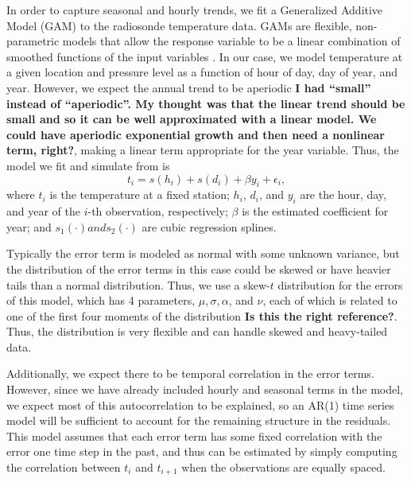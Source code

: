 \documentclass[12pt]{article}
\def\ni{\noindent}
\begin{document}
\begin{doublespacing}
In order to capture seasonal and hourly trends, we fit a Generalized Additive Model (GAM) \cite{hastie90} to the radiosonde temperature data.  GAMs are flexible, non-parametric models that allow the response variable to be a linear combination of smoothed functions of the input variables \cite{bell14}.  In our case, we model temperature at a given location and pressure level as a function of hour of day, day of year, and year.  However, we expect the annual trend to be aperiodic \textbf{I had ``small'' instead of ``aperiodic''.  My thought was that the linear trend should be small and so it can be well approximated with a linear model.  We could have aperiodic exponential growth and then need a nonlinear term, right?}, making a linear term appropriate for the year variable.  Thus, the model we fit and simulate from is
\begin{equation} \label{eq:GAM}
	t_i = s(h_i) + s(d_i) + \beta y_i + \epsilon_i,
\end{equation}
\ni where $t_i$ is the temperature at a fixed station; $h_i$, $d_i$, and $y_i$ are the hour, day, and year of the $i$-th observation, respectively; $\beta$ is the estimated coefficient for year; and $s_1(\cdot) and s_2(\cdot)$ are cubic regression splines.

Typically the error term is modeled as normal with some unknown variance, but the distribution of the error terms in this case could be skewed or have heavier tails than a normal distribution.  Thus, we use a skew-$t$ distribution for the errors of this model, which has 4 parameters, $\mu, \sigma, \alpha$, and $\nu$, each of which is related to one of the first four moments of the distribution \cite{azzalini03} \textbf{Is this the right reference?}.  Thus, the distribution is very flexible and can handle skewed and heavy-tailed data.

Additionally, we expect there to be temporal correlation in the error terms.  However, since we have already included hourly and seasonal terms in the model, we expect most of this autocorrelation to be explained, so an AR(1) time series model will be sufficient to account for the remaining structure in the residuals.  This model assumes that each error term has some fixed correlation with the error one time step in the past, and thus can be estimated by simply computing the correlation between $t_i$ and $t_{i+1}$ when the observations are equally spaced.


\end{doublespacing}
\end{document}
